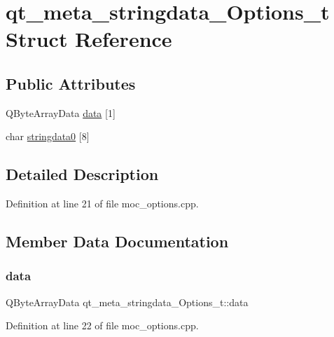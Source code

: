 \hypertarget{structqt__meta__stringdata___options__t}{}\section{qt\+\_\+meta\+\_\+stringdata\+\_\+\+Options\+\_\+t Struct Reference}
\label{structqt__meta__stringdata___options__t}
\subsection*{Public Attributes}
\begin{DoxyCompactItemize}
\item 
Q\+Byte\+Array\+Data \mbox{\hyperlink{structqt__meta__stringdata___options__t_ad630fb0469c0871580fa3053b9b09bb8}{data}} \mbox{[}1\mbox{]}
\item 
char \mbox{\hyperlink{structqt__meta__stringdata___options__t_a1c10b521fc0bfc89e2ad3c4ae2bc0b34}{stringdata0}} \mbox{[}8\mbox{]}
\end{DoxyCompactItemize}


\subsection{Detailed Description}


Definition at line 21 of file moc\+\_\+options.\+cpp.



\subsection{Member Data Documentation}
\mbox{\label{structqt__meta__stringdata___options__t_ad630fb0469c0871580fa3053b9b09bb8}} 
\subsubsection{\texorpdfstring{data}{data}}
{\footnotesize\ttfamily Q\+Byte\+Array\+Data qt\+\_\+meta\+\_\+stringdata\+\_\+\+Options\+\_\+t\+::data}



Definition at line 22 of file moc\+\_\+options.\+cpp.

